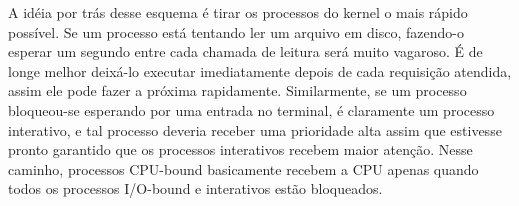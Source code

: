 A idéia por trás desse esquema é tirar os processos do kernel o mais rápido possível. Se um processo está tentando ler um arquivo em disco, fazendo-o esperar um segundo entre cada chamada de leitura será muito vagaroso. É de longe melhor deixá-lo executar imediatamente depois de cada requisição atendida, assim ele pode fazer a próxima rapidamente. Similarmente, se um processo bloqueou-se esperando por uma entrada no terminal, é claramente um processo interativo, e tal processo deveria receber uma prioridade alta assim que estivesse pronto garantido que os processos interativos recebem maior atenção. Nesse caminho, processos CPU-bound basicamente recebem a CPU apenas quando todos os processos I/O-bound e interativos estão bloqueados.
